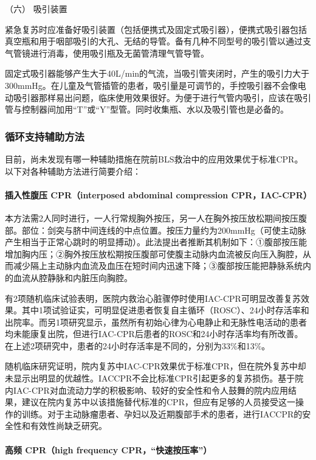 \hypertarget{text00284.htmlux5cux23CHP10-1-5-3-6}{}
（六） 吸引装置

紧急复苏时应准备好吸引装置（包括便携式及固定式吸引器），便携式吸引器包括真空瓶和用于咽部吸引的大孔、无结的导管。备有几种不同型号的吸引管以通过支气管镜进行消毒，使用吸引瓶及无菌管清理气管导管。

固定式吸引器能够产生大于40L/min的气流，当吸引管夹闭时，产生的吸引力大于300mmHg。在儿童及气管插管的患者，吸引量是可调节的，手控吸引器不会像电动吸引器那样易出问题，临床使用效果很好。为便于进行气管内吸引，应该在吸引管与控制器间加用“T”或“Y”型管。同时收集瓶、水以及吸引管也是必备的。

\subsubsection{循环支持辅助方法}

目前，尚未发现有哪一种辅助措施在院前BLS救治中的应用效果优于标准CPR。以下对各种辅助方法进行简要介绍：

\paragraph{插入性腹压 CPR（interposed abdominal compression CPR，IAC-CPR）}

本方法需2人同时进行，一人行常规胸外按压，另一人在胸外按压放松期间按压腹部。部位：剑突与脐中间连线的中点位置。按压力量约为200mmHg（可使主动脉产生相当于正常心跳时的明显搏动）。此法提出者推断其机制如下：①腹部按压能增加胸内压；②胸外按压放松期按压腹部可使腹主动脉内血流被反向压入胸腔，从而减少隔上主动脉内血流及血压在短时间内迅速下降；③腹部按压能把静脉系统内的血流从腔静脉和内脏压向胸腔。

有2项随机临床试验表明，医院内救治心脏骤停时使用IAC-CPR可明显改善复苏效果。其中1项试验证实，可明显促进患者恢复自主循环（ROSC）、24小时存活率和出院率。而另1项研究显示，虽然所有初始心律为心电静止和无脉性电活动的患者均未能康复出院，但进行IAC-CPR后患者的ROSC和24小时存活率均有所改善。在上述2项研究中，患者的24小时存活率是不同的，分别为33\%和13\%。

随机临床研究证明，院内复苏中IAC-CPR效果优于标准CPR，但在院外复苏中却未显示出明显的优越性。IACCPR不会比标准CPR引起更多的复苏损伤。基于院内IAC-CPR对血流动力学的积极影响、较好的安全性和令人鼓舞的院内应用结果，建议在院内复苏中以该措施替代标准的CPR，但应有足够的人员接受这一操作的训练。对于主动脉瘤患者、孕妇以及近期腹部手术的患者，进行IACCPR的安全性和有效性尚缺乏研究。

\paragraph{高频 CPR（high frequency CPR，“快速按压率”）}

